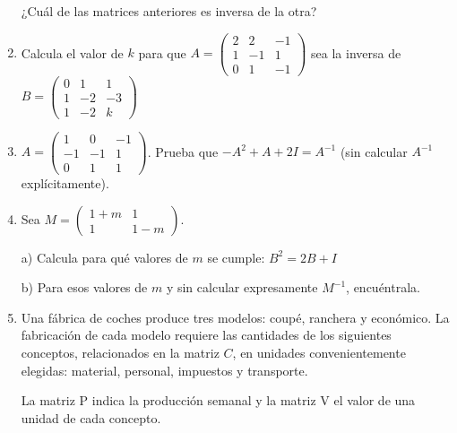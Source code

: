 \begin{enumerate}
¿Cuál de las matrices anteriores es inversa de la otra?

 
\item Calcula el valor de $k$ para que $A=\left( \begin{matrix} 2&2&-1\\1&-1&1 \\0&1&-1  \end{matrix} \right)$ sea la inversa de $B=\left( \begin{matrix} 0&1&1\\1&-2&-3\\1&-2&k  \end{matrix} \right)$


\item $A=\left( \begin{matrix} 1&0&-1\\-1&-1&1 \\0&1&1  \end{matrix} \right)$. Prueba  que $-A^2+A+2I=A^{-1}$ (sin calcular $A^{-1}$ explícitamente).


\item Sea $M=\left( \begin{matrix} 1+m&1\\1&1-m  \end{matrix} \right)$. 

a) Calcula para qué valores de $m$ se cumple: $B^2=2B+I$

b) Para esos valores de $m$ y sin calcular expresamente $M^{-1}$, encuéntrala.







\item Una fábrica de coches produce tres modelos: coupé, ranchera y económico. La fabricación de cada modelo requiere las cantidades de los siguientes conceptos, relacionados en la matriz $C$, en unidades convenientemente elegidas: material, personal, impuestos y transporte.

La matriz P indica la producción semanal y la matriz V el valor de una unidad de cada concepto.


\end{enumerate}
